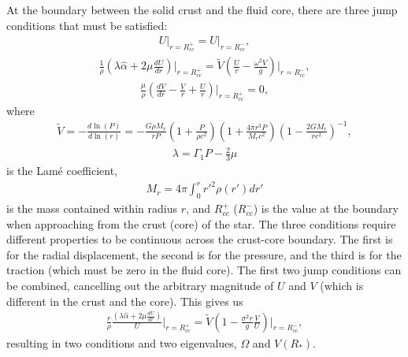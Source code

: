\documentclass[fleqn,usenatbib]{mnras}
\begin{document}


\hspace{\parindent}At the boundary between the solid crust and the fluid core, there are three jump conditions that must be satisfied:
\begin{align}
U\rvert_{r=R_{cc}^{+}}=U\rvert_{r=R_{cc}^{-}},
\label{eq:jump1}
\end{align}
\begin{align}
\frac{1}{\rho}\left(\lambda\hat{\alpha}+2\mu\frac{dU}{dr}\right)\biggr\rvert_{r=R_{cc}^{+}}=\tilde{V}\left(\frac{U}{r}-\frac{\omega^2V}{g}\right)\biggr\rvert_{r=R_{cc}^{-}},
\label{eq:jump2}
\end{align}
\begin{align}
\frac{\mu}{\rho}\left(\frac{dV}{dr}-\frac{V}{r}+\frac{U}{r}\right)\biggr\rvert_{r=R_{cc}^{+}}=0,
\label{eq:jump3}
\end{align}
\noindent where 
\begin{align}
\tilde{V}=-\frac{d\ln\left(P\right)}{d\ln\left(r\right)}=-\frac{G\rho M_r}{rP}\left(1+\frac{P}{\rho c^2}\right)\left(1+\frac{4\pi r^3 P}{M_r c^2}\right)\left(1-\frac{2GM_r}{rc^2}\right)^{-1},
\end{align}
\begin{align}
\lambda=\Gamma_1P-\frac{2}{3}\mu
\end{align}
\noindent is the Lam\'e coefficient, 
\begin{align}
M_r=4\pi\int^r_0 r'^2\rho(r')dr'
\label{eq:mass_r}
\end{align}
\noindent is the mass contained within radius $r$, and $R_{cc}^{+}$ ($R_{cc}^{-}$) is the value at the boundary when approaching from the crust (core) of the star. The three conditions require different properties to be continuous across the crust-core boundary. The first is for the radial displacement, the second is for the pressure, and the third is for the traction (which must be zero in the fluid core). The first two jump conditions can be combined, cancelling out the arbitrary magnitude of $U$ and $V$ (which is different in the crust and the core). This gives us
\begin{align}
\frac{r}{\rho}\frac{\left(\lambda\hat{\alpha}+2\mu\frac{dU}{dr}\right)}{U}\biggr\rvert_{r=R_{cc}^{+}}=\tilde{V}\left(1-\frac{\sigma^2r}{g}\frac{V}{U}\right)\biggr\rvert_{r=R_{cc}^{-}},
\end{align}
\noindent resulting in two conditions and two eigenvalues, $\Omega$ and $V(R_*)$.
\end{document}
